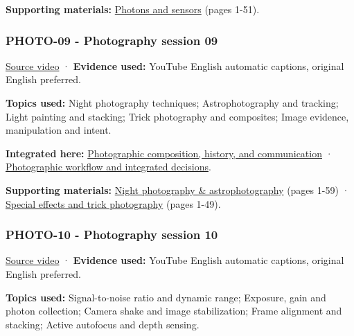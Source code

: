 \textbf{Supporting materials:} \href{https://drive.google.com/open?id=0B6w2XfPHEcZYell0Tkt2YjkwYWc}{Photons and sensors} (pages 1-51).

\subsubsection{PHOTO-09 - Photography session 09}\label{04-visual-computing-ii-ch036-photo-09---photography-session-09}

\hypertarget{04-visual-computing-ii-ch036-photo-09---photography-session-09}{}

\href{https://www.youtube.com/watch?v=1ah8EEqfFsM}{Source video} · \textbf{Evidence used:} YouTube English automatic captions, original English preferred.

\textbf{Topics used:} Night photography techniques; Astrophotography and tracking; Light painting and stacking; Trick photography and composites; Image evidence, manipulation and intent.

\textbf{Integrated here:} \hyperref[04-visual-computing-ii-ch034-photographic-composition-history-and-communication]{Photographic composition, history, and communication} · \hyperref[04-visual-computing-ii-ch034-photographic-workflow-and-integrated-decisions]{Photographic workflow and integrated decisions}.

\textbf{Supporting materials:} \href{https://drive.google.com/open?id=0B6w2XfPHEcZYaTJ5M2RhZzBwWTg}{Night photography \& astrophotography} (pages 1-59) · \href{https://drive.google.com/open?id=0B6w2XfPHEcZYdklBY3BfVTFSSnM}{Special effects and trick photography} (pages 1-49).

\subsubsection{PHOTO-10 - Photography session 10}\label{04-visual-computing-ii-ch036-photo-10---photography-session-10}

\hypertarget{04-visual-computing-ii-ch036-photo-10---photography-session-10}{}

\href{https://www.youtube.com/watch?v=ia9w4ZtdULs}{Source video} · \textbf{Evidence used:} YouTube English automatic captions, original English preferred.

\textbf{Topics used:} Signal-to-noise ratio and dynamic range; Exposure, gain and photon collection; Camera shake and image stabilization; Frame alignment and stacking; Active autofocus and depth sensing.

